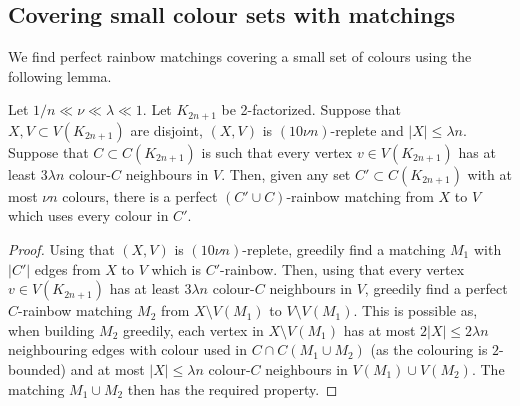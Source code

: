 \subsection{Covering small colour sets with matchings}
We find perfect rainbow matchings covering a small set of colours using the following lemma.
\begin{lemma}\label{colourcover} Let $1/n\ll \nu\ll \lambda\ll 1$. Let $K_{2n+1}$ be 2-factorized. Suppose that $X,V\subset V(K_{2n+1})$ are disjoint,  $(X,V)$ is $(10\nu n)$-replete and $|X|\leq \lambda n$. Suppose that $C\subset C(K_{2n+1})$ is such that every vertex $v\in V(K_{2n+1})$ has at least $3\lambda n$ colour-$C$ neighbours in $V$.
Then, given any set $C'\subset C(K_{2n+1})$ with at most $\nu n$ colours, there is a perfect $(C'\cup C)$-rainbow matching from $X$ to $V$ which uses every colour in $C'$.
\end{lemma}
\begin{proof} Using that $(X,V)$ is $(10\nu n)$-replete, greedily find a matching $M_1$ with $|C'|$ edges from $X$ to $V$ which is $C'$-rainbow. Then, using that every vertex $v\in V(K_{2n+1})$ has at least $3\lambda n$ colour-$C$ neighbours in $V$, greedily find a perfect $C$-rainbow matching $M_2$ from $X\setminus V(M_1)$ to $V\setminus V(M_1)$. This is possible as, when building $M_2$ greedily, each vertex in $X\setminus V(M_1)$ has at most $2|X|\leq 2\lambda n$ neighbouring edges with colour used in $C\cap C(M_1\cup M_2)$ (as the colouring is $2$-bounded) and at most $|X|\leq \lambda n$ colour-$C$ neighbours in $V(M_1)\cup V(M_2)$. 
The matching $M_1\cup M_2$ then has the required property.
\end{proof}








